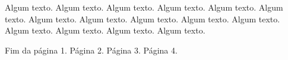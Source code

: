 \documentclass[12pt,a5paper]{memoir}
\begin{document}
Algum texto. Algum texto. Algum texto. Algum texto. Algum texto. Algum texto. Algum texto. Algum texto. Algum texto. Algum texto. Algum texto. Algum texto. Algum texto. Algum texto. Algum texto. 

\vspace*{\fill}

Fim da página 1.\clearpage
Página 2.\clearpage
Página 3.\clearpage
Página 4.\clearpage
\end{document}
